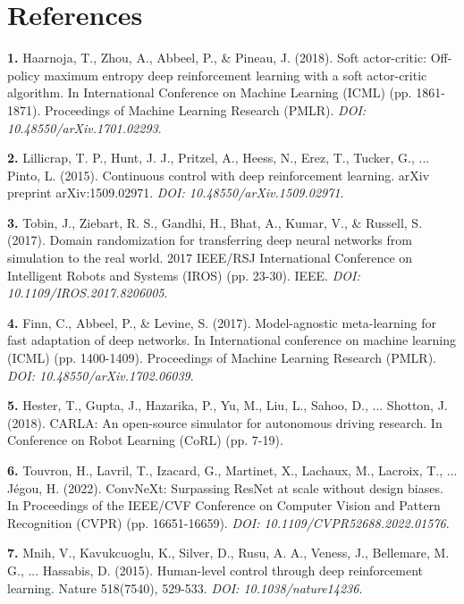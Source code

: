 \documentclass[10pt,twocolumn,letterpaper]{article}
\begin{document}
\section*{References}

\noindent \textbf{1.} Haarnoja, T., Zhou, A., Abbeel, P., \& Pineau, J. (2018). Soft actor-critic: Off-policy maximum entropy deep reinforcement learning with a soft actor-critic algorithm. In International Conference on Machine Learning (ICML) (pp. 1861-1871). Proceedings of Machine Learning Research (PMLR). \textit{DOI: 10.48550/arXiv.1701.02293}.

\noindent \textbf{2.} Lillicrap, T. P., Hunt, J. J., Pritzel, A., Heess, N., Erez, T., Tucker, G., ... Pinto, L. (2015). Continuous control with deep reinforcement learning. arXiv preprint arXiv:1509.02971. \textit{DOI: 10.48550/arXiv.1509.02971}.

\noindent \textbf{3.} Tobin, J., Ziebart, R. S., Gandhi, H., Bhat, A., Kumar, V., \& Russell, S. (2017). Domain randomization for transferring deep neural networks from simulation to the real world. 2017 IEEE/RSJ International Conference on Intelligent Robots and Systems (IROS) (pp. 23-30). IEEE. \textit{DOI: 10.1109/IROS.2017.8206005}.

\noindent \textbf{4.} Finn, C., Abbeel, P., \& Levine, S. (2017). Model-agnostic meta-learning for fast adaptation of deep networks. In International conference on machine learning (ICML) (pp. 1400-1409). Proceedings of Machine Learning Research (PMLR). \textit{DOI: 10.48550/arXiv.1702.06039}.

\noindent \textbf{5.} Hester, T., Gupta, J., Hazarika, P., Yu, M., Liu, L., Sahoo, D., ... Shotton, J. (2018). CARLA: An open-source simulator for autonomous driving research. In Conference on Robot Learning (CoRL) (pp. 7-19).

\noindent \textbf{6.} Touvron, H., Lavril, T., Izacard, G., Martinet, X., Lachaux, M., Lacroix, T., ... Jégou, H. (2022). ConvNeXt: Surpassing ResNet at scale without design biases. In Proceedings of the IEEE/CVF Conference on Computer Vision and Pattern Recognition (CVPR) (pp. 16651-16659). \textit{DOI: 10.1109/CVPR52688.2022.01576}.

\noindent \textbf{7.} Mnih, V., Kavukcuoglu, K., Silver, D., Rusu, A. A., Veness, J., Bellemare, M. G., ... Hassabis, D. (2015). Human-level control through deep reinforcement learning. Nature 518(7540), 529-533. \textit{DOI: 10.1038/nature14236}.
\end{document}
